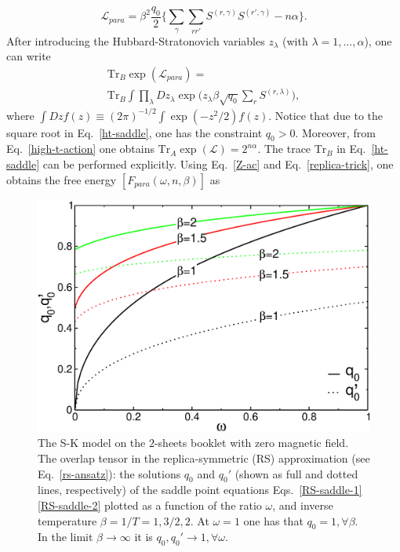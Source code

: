 \documentclass[twocolumn,superscriptaddress,prb,10pt]{revtex4-1}
\def\tr{\textrm{Tr}}
\begin{document}
%
\begin{equation}
\label{high-t-action}
{\mathcal L}_{para}=\beta^2\frac{q_0}{2}\Big\{\sum_\gamma\sum_{rr'}S^{(r,
\gamma)}S^{(r',\gamma)}-n\alpha\Big\}.
\end{equation}
%
After introducing the Hubbard-Stratonovich variables $z_\lambda$ (with 
$\lambda=1,\dots,\alpha$), one can write 
%
\begin{multline}
\label{ht-saddle}
\textrm{Tr}_B\exp({\mathcal L}_{para})=\\\tr_B\int\prod_\lambda Dz_{\lambda}
\exp\Big(z_\lambda\beta\sqrt{q_0}\sum_r S^{(r,\lambda)}\Big),
\end{multline}
%
where $\int Dz f(z)\equiv(2\pi)^{-1/2}\int\exp(-z^2/2)f(z)$. Notice that 
due to the square root in Eq.~\eqref{ht-saddle}, one has the constraint 
$q_0>0$. Moreover, from Eq.~\eqref{high-t-action} 
one obtains $\textrm{Tr}_A\exp({\mathcal L})=2^{n\alpha}$. The trace 
$\textrm{Tr}_B$ in Eq.~\eqref{ht-saddle} can be performed explicitly. 
Using Eq.~\eqref{Z-ac} and Eq.~\eqref{replica-trick}, one obtains 
the free energy $[F_{para}(\omega,n,\beta)]$ as  
%
\begin{figure}[t]
\includegraphics*[width=0.9\linewidth]{./draft_figs/RSB0_saddle}
\caption{\label{RSB0-saddle}
 The S-K model on the $2$-sheets booklet with zero magnetic field. The 
 overlap tensor in the replica-symmetric (RS) approximation (see Eq.~\eqref{rs-ansatz}): 
 the solutions $q_0$ and $q_0'$ (shown as full and dotted lines, respectively) 
 of the saddle point equations Eqs.~\eqref{RS-saddle-1}\eqref{RS-saddle-2} 
 plotted as a function of the ratio $\omega$, and inverse temperature 
 $\beta=1/T=1,3/2,2$. At $\omega=1$ one has that $q_0=1,\forall\beta$.
 In the limit $\beta\to\infty$ it is $q_0,q_0'\to 1,\forall\omega$.
}
\label{RSB0_saddle}
\end{figure}
\end{document}
